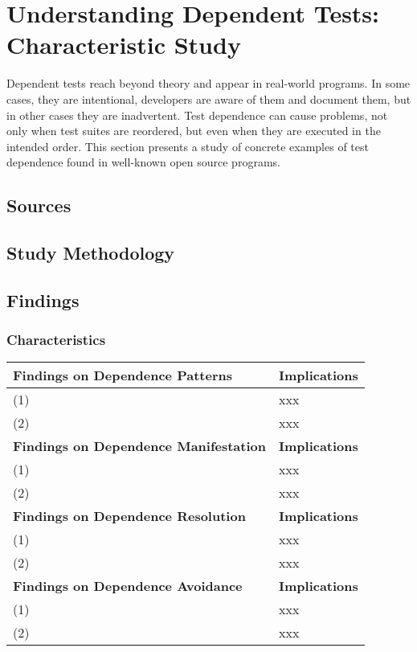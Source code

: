 \section{Understanding Dependent Tests: Characteristic Study}
\label{sec:study}

Dependent tests reach beyond theory and appear in real-world programs.  
In some cases, they are intentional, developers are aware of them and
document them, but in other cases they are inadvertent. 
Test dependence can cause problems, not only when test suites are reordered,
but even when they are
executed in the intended order.
This section presents a study of concrete examples of test dependence found in
well-known open source programs. 

\subsection{Sources}

\subsection{Study Methodology}

\subsection{Findings}

\subsubsection{Characteristics}


\begin{table*}[t]
\vspace{1mm}
\centering
\small{
\begin{tabular}{|l|l|}
\hline
 \textbf{Findings on Dependence Patterns} & \textbf{Implications} \\
 \hline
 \hline
(1) & xxx \\
 \hline
(2) & xxx \\
\hline
 \textbf{Findings on Dependence Manifestation} & \textbf{Implications} \\
 \hline
 \hline
(1) & xxx \\
 \hline
(2) & xxx \\
\hline
 \textbf{Findings on Dependence Resolution} & \textbf{Implications} \\
 \hline
 \hline
(1) & xxx \\
 \hline
(2) & xxx \\
\hline
 \textbf{Findings on Dependence Avoidance} & \textbf{Implications} \\
 \hline
 \hline
(1) & xxx \\
 \hline
(2) & xxx \\
\hline
\end{tabular}
}
\vspace{-2mm}
\caption{{\label{tab:findings} }
}
\end{table*}

